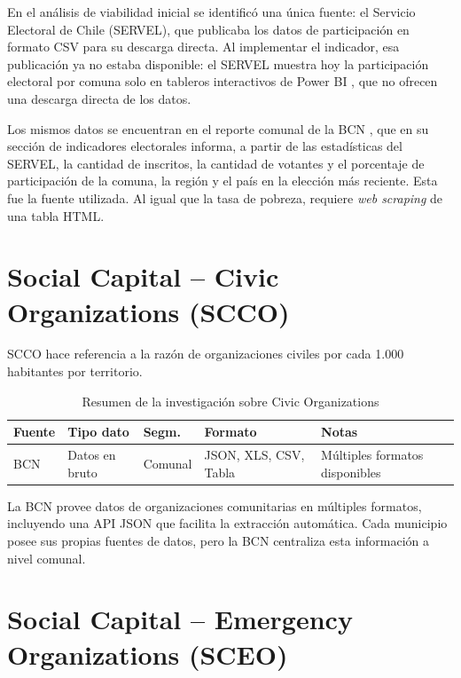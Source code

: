 \documentclass[12pt,letterpaper,oneside]{report}
\begin{document}
En el an\'alisis de viabilidad inicial se identific\'o una \'unica fuente: el Servicio Electoral de Chile (SERVEL), que publicaba los datos de participaci\'on en formato CSV para su descarga directa. Al implementar el indicador, esa publicaci\'on ya no estaba disponible: el SERVEL muestra hoy la participaci\'on electoral por comuna solo en tableros interactivos de Power BI \parencite{servel-participacion}, que no ofrecen una descarga directa de los datos.

Los mismos datos se encuentran en el reporte comunal de la BCN \parencite{bcn-d}, que en su secci\'on de indicadores electorales informa, a partir de las estad\'isticas del SERVEL, la cantidad de inscritos, la cantidad de votantes y el porcentaje de participaci\'on de la comuna, la regi\'on y el pa\'is en la elecci\'on m\'as reciente. Esta fue la fuente utilizada. Al igual que la tasa de pobreza, requiere \textit{web scraping} de una tabla HTML.

\section{Social Capital -- Civic Organizations (SCCO)}
\label{sec:scco}

SCCO hace referencia a la raz\'on de organizaciones civiles por cada 1.000 habitantes por territorio.

\begin{table}[H]
\centering
\caption{Resumen de la investigaci\'on sobre Civic Organizations}
\label{tab:scco}
\begin{tabular}{|p{3cm}|p{2.5cm}|p{2cm}|p{2cm}|p{3cm}|}
\hline
\textbf{Fuente} & \textbf{Tipo dato} & \textbf{Segm.} & \textbf{Formato} & \textbf{Notas} \\
\hline
BCN \parencite{bcn-b} & Datos en bruto & Comunal & JSON, XLS, CSV, Tabla & M\'ultiples formatos disponibles \\
\hline
\end{tabular}
\end{table}

La BCN provee datos de organizaciones comunitarias en m\'ultiples formatos, incluyendo una API JSON que facilita la extracci\'on autom\'atica. Cada municipio posee sus propias fuentes de datos, pero la BCN centraliza esta informaci\'on a nivel comunal.

\section{Social Capital -- Emergency Organizations (SCEO)}
\label{sec:sceo}
\end{document}
